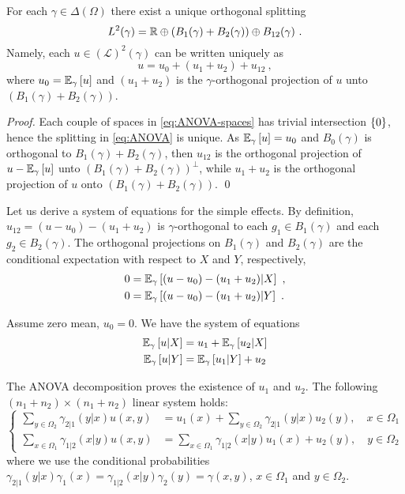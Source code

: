 \documentclass[runningheads]{llncs}
\begin{document}
\begin{proposition}For each $\gamma \in \Delta(\Omega)$ there exist a unique orthogonal splitting
%
\begin{equation*}
%
  L^2(\gamma) = \reals \oplus \left(B_1(\gamma) + B_2(\gamma)\right) \oplus B_{12}(\gamma) \ . 
\end{equation*}
Namely, each $u \in (\mathcal L)^2(\gamma)$ can be written uniquely as
\begin{equation}
 \label{eq:ANOVA}
 u = u_0 + (u_1 + u_2) + u_{12} \ ,
\end{equation}
where $u_0={\operatorname{\mathbb E}}_{\gamma}\left[u\right]$ and $(u_1+u_2)$ is the $\gamma$-orthogonal projection of $u$ unto
$(B_1(\gamma) + B_2(\gamma))$.
\end{proposition}

\begin{proof}Each couple of spaces in \cref{eq:ANOVA-spaces} has trivial intersection $\left\{ 0 \right\}$, hence the splitting in \cref{eq:ANOVA} is unique. As ${\operatorname{\mathbb E}}_{\gamma}\left[u\right] = u_0$ and $B_0(\gamma)$ is orthogonal to $B_1(\gamma)+B_2(\gamma)$, then $u_{12}$ is the orthogonal projection of $u - {\operatorname{\mathbb E}}_{\gamma}\left[u\right]$ unto $(B_1(\gamma)+B_2(\gamma))^\perp$, while $u_1+u_2$ is the orthogonal projection of $u$ onto $(B_1(\gamma)+B_2(\gamma))$. \qed
\end{proof}

Let us derive a system of equations for the simple effects. By definition, $u_{12} = (u - u_0) - (u_1 + u_2)$ is $\gamma$-orthogonal to each $g_1 \in B_1(\gamma)$ and each $g_2 \in B_2(\gamma)$. The orthogonal projections on $B_1(\gamma)$ and $B_2(\gamma)$ are the conditional expectation with respect to $X$ and $Y$, respectively,
%
  \begin{align*}
    0 &= {\operatorname{\mathbb E}}_{\gamma}\left[(u-u_0) - (u_1+u_2) \middle| X\right]  \ , \\
   0 &= {\operatorname{\mathbb E}}_{\gamma}\left[(u-u_0) - (u_1+u_2) \middle| Y\right] \ .
  \end{align*}

Assume zero mean, $u_0=0$. We have the system of equations
\begin{align*}
  {\operatorname{\mathbb E}}_{\gamma}\left[u \middle| X\right] &=  u_1 + {\operatorname{\mathbb E}}_{\gamma}\left[u_2 \middle| X\right] \\
  {\operatorname{\mathbb E}}_{\gamma}\left[u \middle| Y\right] &= {\operatorname{\mathbb E}}_{\gamma}\left[u_1 \middle| Y\right] + u_2
\end{align*}

The ANOVA decomposition proves the existence of $u_1$ and $u_2$.  The following $(n_1+n_2)\times(n_1+n_2)$ linear system holds:
\begin{equation*}
\begin{cases}
  \sum_{y \in \Omega_2} \gamma_{2|1}(y|x)u(x,y) &= u_1(x) + \sum_{y \in \Omega_2} \gamma_{2|1}(y|x) u_2(y) , \quad x \in \Omega_1 \\
  \sum_{x \in \Omega_1} \gamma_{1|2}(x|y)u(x,y) &= \sum_{x \in \Omega_1} \gamma_{1|2}(x|y) u_1(x)  + u_2(y) , \quad y \in \Omega_2
\end{cases}
\end{equation*}
where we use the conditional probabilities $\gamma_{2|1}(y|x) \gamma_1(x) = \gamma_{1|2}(x|y) \gamma_2(y) = \gamma(x,y)$, $x \in \Omega_1$ and $y \in \Omega_2$.
\end{document}
